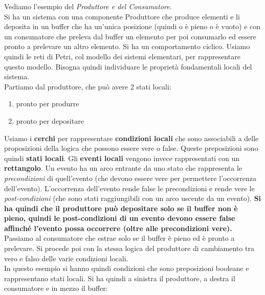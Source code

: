\begin{esempio}
  Vediamo l'esempio del \textit{Produttore e del Consumatore}.\\
  Si ha un sistema con una componente Produttore che produce elementi e li
  deposita in un buffer che ha un'unica posizione (quindi o è pieno o è vuoto) e
  con un consumatore che preleva dal buffer un elemento per poi consumarlo ed
  essere pronto a prelevare un altro elemento. Si ha un comportamento
  ciclico. Usiamo quindi le reti di Petri, col modello dei sistemi elementari,
  per rappresentare questo modello. Bisogna quindi individuare le proprietà
  fondamentali locali del sistema.\\
  Partiamo dal produttore, che può avere 2 stati locali:
  \begin{enumerate}
    \item pronto per produrre
    \item pronto per depositare
  \end{enumerate}
  Usiamo i \textbf{cerchi} per rappresentare \textbf{condizioni locali} che sono
  associabili a delle proposizioni della logica che possono essere vere o
  false. Queste preposizioni sono quindi \textbf{stati locali}. Gli \textbf{eventi locali} vengono
  invece rappresentati con un \textbf{rettangolo}. Un evento ha un arco entrante
  da uno stato che rappresenta le \textit{precondizioni} di quell'evento (che
  devono essere vere per permettere l'occorrenza dell'evento). L'occorrenza
  dell'evento rende false le precondizioni e rende vere le
  \textit{post-condizioni} (che sono stati raggiungibili con un arco uscente da
  un evento). \textbf{Si ha quindi che il produttore può depositare solo se il buffer
  non è pieno, quindi le post-condizioni di un evento devono essere false
  affinché l'evento possa occorrere (oltre alle precondizioni vere).}\\
  Passiamo al consumatore che estrae solo se il buffer è pieno ed è pronto a
  prelevare. Si procede poi con la stessa logica del produttore di cambiamento
  tra vero e falso delle varie condizioni locali.\\
  In questo esempio si hanno quindi condizioni che sono preposizioni booleane e
  rappresentano stati locali. Si ha quindi a sinistra il produttore, a destra il
  consumatore e in mezzo il buffer:
  \begin{center}
\end{center}
\end{esempio}
